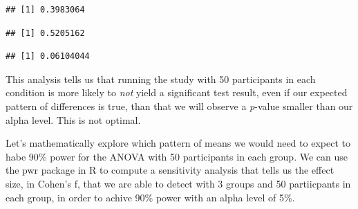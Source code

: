 \documentclass[]{book}
\newenvironment{Shaded}{\begin{snugshade}}{\end{snugshade}}
\newcommand{\DataTypeTok}[1]{\textcolor[rgb]{0.13,0.29,0.53}{#1}}
\newcommand{\DecValTok}[1]{\textcolor[rgb]{0.00,0.00,0.81}{#1}}
\newcommand{\FloatTok}[1]{\textcolor[rgb]{0.00,0.00,0.81}{#1}}
\newcommand{\KeywordTok}[1]{\textcolor[rgb]{0.13,0.29,0.53}{\textbf{#1}}}
\newcommand{\NormalTok}[1]{#1}
\newcommand{\OperatorTok}[1]{\textcolor[rgb]{0.81,0.36,0.00}{\textbf{#1}}}
\newcommand{\StringTok}[1]{\textcolor[rgb]{0.31,0.60,0.02}{#1}}
\begin{document}
\begin{verbatim}
## [1] 0.3983064
\end{verbatim}

\begin{Shaded}
\end{Shaded}

\begin{verbatim}
## [1] 0.5205162
\end{verbatim}

\begin{Shaded}
\end{Shaded}

\begin{verbatim}
## [1] 0.06104044
\end{verbatim}

This analysis tells us that running the study with 50 participants in each condition is more likely to \emph{not} yield a significant test result, even if our expected pattern of differences is true, than that we will observe a \emph{p}-value smaller than our alpha level. This is not optimal.

Let's mathematically explore which pattern of means we would need to expect to habe 90\% power for the ANOVA with 50 participants in each group. We can use the pwr package in R to compute a sensitivity analysis that tells us the effect size, in Cohen's f, that we are able to detect with 3 groups and 50 partiicpants in each group, in order to achive 90\% power with an alpha level of 5\%.
\end{document}
